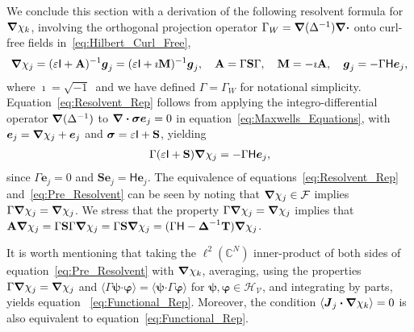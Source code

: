 \documentclass[leqno,onefignum,onetabnum]{siamltex1213}
\newcommand{\Mb}{\mathbf{M}}
\newcommand{\Tb}{\mathbf{T}}
\newcommand{\Sb}{\mathbf{S}}
\newcommand{\Ab}{\mathbf{A}}
\newcommand{\Vc}{\mathcal{V}}
\newcommand{\Hc}{\mathcal{H}}
\newcommand{\Fc}{\mathcal{F}}
\newcommand{\Hm}{\mathsf{H}}
\newcommand{\Ib}{\mathsf{I}}
\newcommand\bsig{\mbox{\boldmath${\sigma}$}}
\newcommand\bDelta{\mbox{\boldmath${\Delta}$}}
\newcommand\bnabla{\mbox{\boldmath${\nabla}$}}
\providecommand\bcdot{\boldsymbol{\cdot}}
\newcommand{\vecJ}{\boldsymbol{J}}
\newcommand{\vecg}{\boldsymbol{g}}
\newcommand{\vece}{\boldsymbol{e}}
\newcommand{\vecpsi}{\boldsymbol{\psi}}
\newcommand{\vecvarphi}{\boldsymbol{\varphi}}
\begin{document}
We conclude this section with a derivation of the following resolvent
formula for $\bnabla \chi_k$, involving the orthogonal projection
operator $\Gamma_W=\bnabla (\Delta^{-1})\bnabla \bcdot$ onto curl-free
fields in~\eqref{eq:Hilbert_Curl_Free},   
\begin{align}\label{eq:Resolvent_Rep}
  \bnabla \chi_j=(\varepsilon\Ib+\Ab)^{-1}\vecg_j
           =(\varepsilon\Ib+\imath\Mb)^{-1}\vecg_j, \quad
  \Ab=\Gamma\Sb\Gamma, \quad
  \Mb=-\imath\Ab, \quad
  \vecg_j=-\Gamma\Hm\vece _j,
\end{align}
%
where $\imath=\sqrt{-1}\,$ and we have defined $\Gamma=\Gamma_W$ for
notational simplicity. Equation~\eqref{eq:Resolvent_Rep} follows from
applying the integro-differential operator $\bnabla (\Delta^{-1})$ to
$\bnabla \bcdot\bsig\vece _j=0$ in equation~\eqref{eq:Maxwells_Equations},
with $\vece _j=\bnabla \chi_j+\vece _j$ and $\bsig=\varepsilon\Ib+\Sb$, yielding  
%
\begin{align}\label{eq:Pre_Resolvent}
  \Gamma(\varepsilon\Ib+\Sb)\bnabla \chi_j=-\Gamma\Hm\vece _j,
\end{align}
%
since $\Gamma\vece _j=0$ and $\Sb\vece _j=\Hm\vece _j$.
The equivalence of equations~\eqref{eq:Resolvent_Rep}
and~\eqref{eq:Pre_Resolvent} can be seen by noting that 
$\bnabla \chi_j\in\Fc$ implies $\Gamma\bnabla \chi_j=\bnabla \chi_j$. We stress
that the property $\Gamma\bnabla \chi_j=\bnabla \chi_j$ implies that
$\Ab\bnabla \chi_j=\Gamma\Sb\Gamma\bnabla \chi_j=\Gamma\Sb\bnabla \chi_j
=(\Gamma\Hm-\bDelta^{-1}\Tb)\bnabla \chi_j$. 



It is worth mentioning that taking the  $\ell^2(\mathbb{C}^N)$
inner-product of both sides of equation~\eqref{eq:Pre_Resolvent} with
$\bnabla \chi_k$, averaging, using the properties
$\Gamma\bnabla \chi_j=\bnabla \chi_j$ and
$\langle\Gamma\vecpsi\bcdot\vecvarphi\rangle=\langle\vecpsi\bcdot\Gamma\vecvarphi\rangle$ for 
$\vecpsi,\vecvarphi\in\Hc_{\Vc}$, and integrating by parts, yields
equation ~\eqref{eq:Functional_Rep}. Moreover, the condition
$\langle\vecJ_j\bcdot\bnabla \chi_k\rangle=0$ is also equivalent to
equation~\eqref{eq:Functional_Rep}.    
\end{document}

